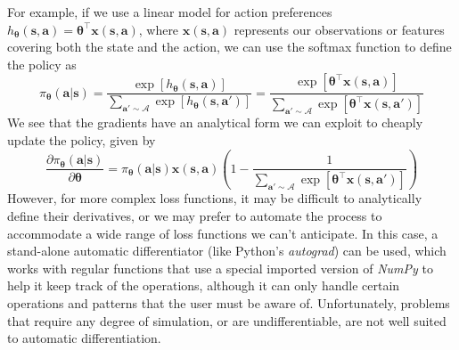 \documentclass{article}
\begin{document}
For example, if we use a linear model for action preferences $h_{\boldsymbol{\theta}}(\mathbf{s},\mathbf{a})=\boldsymbol{\theta}^\top\mathbf{x}(\mathbf{s},\mathbf{a})$, where $\mathbf{x}(\mathbf{s},\mathbf{a})$ represents our observations or features covering both the state and the action, we can use the softmax function to define the policy as \begin{equation}\pi_{\boldsymbol{\theta}}(\mathbf{a}|\mathbf{s})=\frac{\exp[h_{\boldsymbol{\theta}}(\mathbf{s},\mathbf{a})]}{\sum_{\mathbf{a}'\sim\mathcal{A}}\exp[h_{\boldsymbol{\theta}}(\mathbf{s},\mathbf{a}')]}=\frac{\exp[\boldsymbol{\theta}^\top\mathbf{x}(\mathbf{s},\mathbf{a})]}{\sum_{\mathbf{a}'\sim\mathcal{A}}\exp[\boldsymbol{\theta}^\top\mathbf{x}(\mathbf{s},\mathbf{a}')]}\end{equation}We see that the gradients have an analytical form we can exploit to cheaply update the policy, given by \begin{equation}\frac{\partial \pi_{\boldsymbol{\theta}}(\mathbf{a}|\mathbf{s})}{\partial \boldsymbol{\theta}}=\pi_{\boldsymbol{\theta}}(\mathbf{a}|\mathbf{s})\mathbf{x}(\mathbf{s},\mathbf{a})\left(1-\frac{1}{\sum_{\mathbf{a}'\sim\mathcal{A}}\exp[\boldsymbol{\theta}^\top\mathbf{x}(\mathbf{s},\mathbf{a}')]}\right)\end{equation}
However, for more complex loss functions, it may be difficult to analytically define their derivatives, or we may prefer to automate the process to accommodate a wide range of loss functions we can't anticipate. In this case, a stand-alone automatic differentiator (like Python's \textit{autograd}) can be used, which works with regular functions that use a special imported version of \textit{NumPy} to help it keep track of the operations, although it can only handle certain operations and patterns that the user must be aware of. Unfortunately, problems that require any degree of simulation, or are undifferentiable, are not well suited to automatic differentiation.
\end{document}
